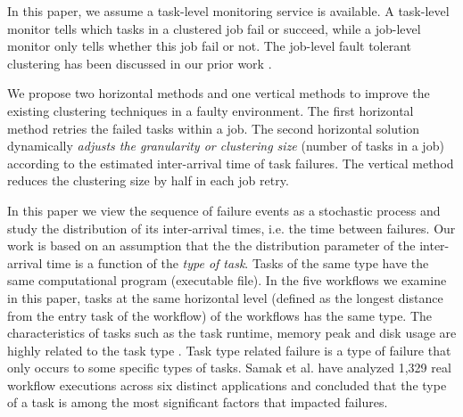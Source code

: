 \documentclass{IOS-Book-Article}
\begin{document}
In this paper, we assume a task-level monitoring service is available. A task-level monitor tells which tasks in a clustered job fail or succeed, while a job-level monitor only tells whether this job fail or not. The job-level fault tolerant clustering has been discussed in our prior work \cite{Chen2012}. 

We propose two horizontal methods and one vertical methods to improve the existing clustering techniques in a faulty environment. The first horizontal method retries the failed tasks within a job. The second horizontal solution dynamically \emph{adjusts the granularity or clustering size} (number of tasks in a job) according to the estimated inter-arrival time of task failures. The vertical method reduces the clustering size by half in each job retry. 

In this paper we view the sequence of failure events as a stochastic process and study the distribution of its inter-arrival times, i.e. the time between failures. Our work is based on an assumption that the the distribution parameter of the inter-arrival time is a function of the \emph{type of task}. Tasks of the same type have the same computational program (executable file). In the five workflows we examine in this paper, tasks at the same horizontal level (defined as the longest distance from the entry task of the workflow) of the workflows has the same type. 
The characteristics of tasks such as the task runtime, memory peak and disk usage are highly related to the task type \cite{da2013toward, Juve2013}.
Task type related failure is a type of failure that only occurs to some specific types of tasks. Samak \cite{Samak2011} et al. have analyzed 1,329 real workflow executions across six distinct applications and concluded that the type of a task is among the most significant factors that impacted failures. 
\end{document}
